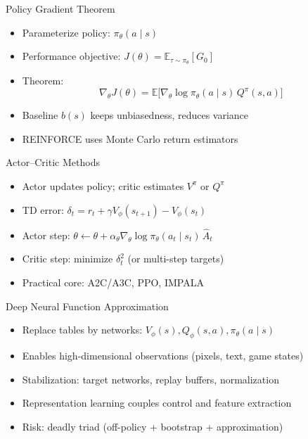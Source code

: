 \documentclass[aspectratio=169]{beamer}
\begin{document}
\begin{frame}{Policy Gradient Theorem}
\begin{itemize}
  \item Parameterize policy: $\pi_\theta(a\mid s)$
  \item Performance objective: $J(\theta)=\mathbb{E}_{\tau\sim\pi_\theta}[G_0]$
  \item Theorem:
  \[
  \nabla_\theta J(\theta)=\mathbb{E}\big[\nabla_\theta\log\pi_\theta(a\mid s)\,Q^{\pi}(s,a)\big]
  \]
  \item Baseline $b(s)$ keeps unbiasedness, reduces variance
  \item REINFORCE uses Monte Carlo return estimators
\end{itemize}
\end{frame}

\begin{frame}{Actor--Critic Methods}
\begin{itemize}
  \item Actor updates policy; critic estimates $V^\pi$ or $Q^\pi$
  \item TD error: $\delta_t=r_t+\gamma V_\phi(s_{t+1})-V_\phi(s_t)$
  \item Actor step: $\theta\leftarrow\theta+\alpha_\theta\nabla_\theta\log\pi_\theta(a_t\mid s_t)\,\hat A_t$
  \item Critic step: minimize $\delta_t^2$ (or multi-step targets)
  \item Practical core: A2C/A3C, PPO, IMPALA
\end{itemize}
\end{frame}

\begin{frame}{Deep Neural Function Approximation}
\begin{itemize}
  \item Replace tables by networks: $V_\phi(s), Q_\phi(s,a), \pi_\theta(a\mid s)$
  \item Enables high-dimensional observations (pixels, text, game states)
  \item Stabilization: target networks, replay buffers, normalization
  \item Representation learning couples control and feature extraction
  \item Risk: deadly triad (off-policy + bootstrap + approximation)
\end{itemize}
\end{frame}
\end{document}
